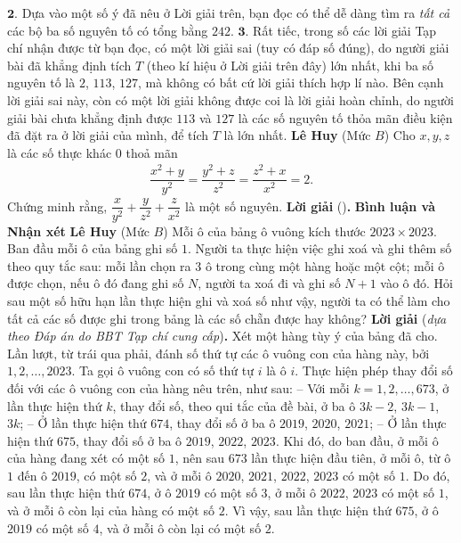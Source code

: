 \begin{multicols}{2}
	\vskip 0.05cm
	$\pmb{2.}$ Dựa vào một số ý đã nêu ở Lời giải trên, bạn đọc có thể dễ dàng tìm ra \textit{tất cả} các bộ ba số nguyên tố có tổng bằng $242$.
	\vskip 0.05cm
	$\pmb{3.}$ Rất tiếc, trong số các lời giải Tạp chí nhận được từ bạn đọc, có một lời giải sai (tuy có đáp số đúng), do người giải bài đã khẳng định tích $T$ (theo kí hiệu ở Lời giải trên đây) lớn nhất, khi ba số nguyên tố là $2$, $113$, $127$, mà không có bất cứ lời giải thích hợp lí nào. Bên cạnh lời giải sai này, còn có một lời giải không được coi là lời giải hoàn chỉnh, do người giải bài chưa khẳng định được $113$ và $127$ là các số nguyên tố thỏa mãn điều kiện đã đặt ra ở lời giải của mình, để tích $T$ là lớn nhất.
	\vskip 0.05cm
	\hfill \textbf{Lê Huy}
	\vskip 0.05cm
	{}
	(Mức $B$) Cho $x,y,z$ là các số thực khác $0$ thoả mãn 
	\begin{align*}
		\dfrac{x^2+y}{y^2}=\dfrac{y^2+z}{z^2}=\dfrac{z^2+x}{x^2}=2.
	\end{align*}
	Chứng minh rằng, $\dfrac x{y^2}+\dfrac y{z^2}+\dfrac z{x^2}$ là một số nguyên.
	\vskip 0.05cm
	\textbf{Lời giải} ()\textbf{.}
	\vskip 0.05cm
	\textbf{Bình luận và Nhận xét}
	\vskip 0.05cm
	\hfill\textbf{Lê Huy}
	\vskip 0.05cm
	(Mức $B$) Mỗi ô của bảng ô vuông kích thước $2023\times2023$. Ban đầu mỗi ô của bảng ghi số $1$. Người ta thực hiện việc ghi xoá và ghi thêm số theo quy tắc sau: mỗi lần chọn ra $3$ ô trong cùng một hàng hoặc một cột; mỗi ô được chọn, nếu ô đó đang ghi số $N$, người ta xoá đi và ghi số $N+1$ vào ô đó. 
	\vskip 0.05cm
	Hỏi sau một số hữu hạn lần thực hiện ghi và xoá số như vậy, người ta có thể làm cho tất cả các số được ghi trong bảng là các số chẵn được hay không?
	\textbf{Lời giải} (\textit{dựa theo Đáp án do BBT Tạp chí cung cấp})\textbf{.}
	\vskip 0.05cm
	Xét một hàng tùy ý của bảng đã cho. Lần lượt, từ trái qua phải, đánh số thứ tự các ô vuông con của hàng này, bởi $1, 2, \ldots, 2023$. Ta gọi ô vuông con có số thứ tự $i$ là ô $i$.
	\vskip 0.05cm
	Thực hiện phép thay đổi số đối với các ô vuông con của hàng nêu trên, như sau:
	\vskip 0.05cm
	-- Với mỗi $k = 1, 2, \ldots, 673$, ở lần thực hiện thứ $k$, thay đổi số, theo qui tắc của đề bài, ở ba ô $3k - 2$, $3k - 1$, $3k$;
	\vskip 0.05cm
	-- Ở lần thực hiện thứ $674$, thay đổi số ở ba ô $2019$, $2020$, $2021$;
	\vskip 0.05cm
	-- Ở lần thực hiện thứ $675$, thay đổi số ở ba ô $2019$, $2022$, $2023$.
	\vskip 0.05cm
	Khi đó, do ban đầu, ở mỗi ô của hàng đang xét có một số $1$, nên sau $673$ lần thực hiện đầu tiên, ở mỗi ô, từ ô $1$ đến ô $2019$, có một số $2$, và ở mỗi ô $2020$, $2021$, $2022$, $2023$ có một số $1$. Do đó, sau lần thực hiện thứ $674$, ở ô $2019$ có một số $3$, ở mỗi ô $2022$, $2023$ có một số $1$, và ở mỗi ô còn lại của hàng có một số $2$. Vì vậy, sau lần thực hiện thứ $675$, ở ô $2019$ có một số $4$, và ở mỗi ô còn lại có một số $2$.

\end{multicols}

